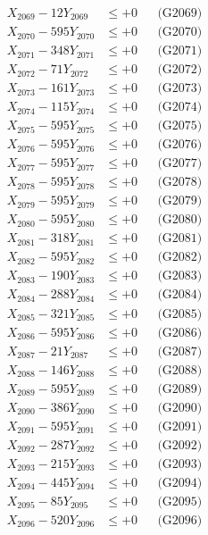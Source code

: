\documentclass[a4paper,10pt]{article}
\begin{document}
{\begin{align}
X_{2069} - 12Y_{2069} &\leq +0 && \text{(G2069)} \\
X_{2070} - 595Y_{2070} &\leq +0 && \text{(G2070)} \\
\allowbreak
X_{2071} - 348Y_{2071} &\leq +0 && \text{(G2071)} \\
X_{2072} - 71Y_{2072} &\leq +0 && \text{(G2072)} \\
X_{2073} - 161Y_{2073} &\leq +0 && \text{(G2073)} \\
X_{2074} - 115Y_{2074} &\leq +0 && \text{(G2074)} \\
X_{2075} - 595Y_{2075} &\leq +0 && \text{(G2075)} \\
X_{2076} - 595Y_{2076} &\leq +0 && \text{(G2076)} \\
X_{2077} - 595Y_{2077} &\leq +0 && \text{(G2077)} \\
X_{2078} - 595Y_{2078} &\leq +0 && \text{(G2078)} \\
X_{2079} - 595Y_{2079} &\leq +0 && \text{(G2079)} \\
X_{2080} - 595Y_{2080} &\leq +0 && \text{(G2080)} \\
\allowbreak
X_{2081} - 318Y_{2081} &\leq +0 && \text{(G2081)} \\
X_{2082} - 595Y_{2082} &\leq +0 && \text{(G2082)} \\
X_{2083} - 190Y_{2083} &\leq +0 && \text{(G2083)} \\
X_{2084} - 288Y_{2084} &\leq +0 && \text{(G2084)} \\
X_{2085} - 321Y_{2085} &\leq +0 && \text{(G2085)} \\
X_{2086} - 595Y_{2086} &\leq +0 && \text{(G2086)} \\
X_{2087} - 21Y_{2087} &\leq +0 && \text{(G2087)} \\
X_{2088} - 146Y_{2088} &\leq +0 && \text{(G2088)} \\
X_{2089} - 595Y_{2089} &\leq +0 && \text{(G2089)} \\
X_{2090} - 386Y_{2090} &\leq +0 && \text{(G2090)} \\
\allowbreak
X_{2091} - 595Y_{2091} &\leq +0 && \text{(G2091)} \\
X_{2092} - 287Y_{2092} &\leq +0 && \text{(G2092)} \\
X_{2093} - 215Y_{2093} &\leq +0 && \text{(G2093)} \\
X_{2094} - 445Y_{2094} &\leq +0 && \text{(G2094)} \\
X_{2095} - 85Y_{2095} &\leq +0 && \text{(G2095)} \\
X_{2096} - 520Y_{2096} &\leq +0 && \text{(G2096)} \\

\end{align}}
\end{document}
